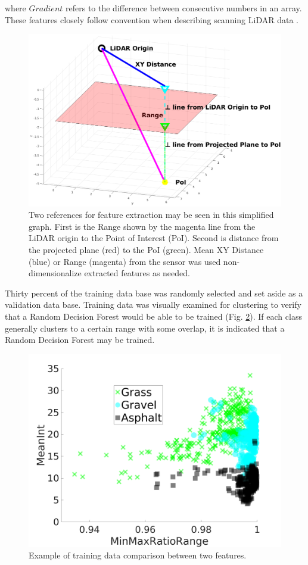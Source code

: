\documentclass[numbered,pdftex]{ohio-etd}
\begin{document}
{{		{where $Gradient$ refers to the difference between consecutive numbers in an array. These features closely follow convention when describing scanning LiDAR data \cite{breiman_random_2001}.}
		
		
		\begin{figure}[H]
			\centering
			\includegraphics[width=1\linewidth]{Defense_Images/xy_vs_range}
			\caption[XY vs Range vs Z Height]{Two references for feature extraction may be seen in this simplified graph. First is the Range shown by the magenta line from the LiDAR origin to the Point of Interest (PoI). Second is distance from the projected plane (red) to the PoI (green). Mean XY Distance (blue) or Range (magenta) from the sensor was used non-dimensionalize extracted features as needed.}
			\label{fig:xy_vs_range}
		\end{figure}
	
		{Thirty percent of the training data base was randomly selected and set aside as a validation data base. Training data was visually examined for clustering to verify that a Random Decision Forest would be able to be trained (Fig. \ref{fig:range_training_data_cluster_3}). If each class generally clusters to a certain range with some overlap, it is indicated that a Random Decision Forest may be trained.}
		
		\begin{figure}[H]
			\centering
			\includegraphics[width=0.75\linewidth]{Defense_Images/training_data_cluster_3}
			\caption[Example Clustering]{Example of training data comparison between two features.}
			\label{fig:range_training_data_cluster_3}
		\end{figure}
		
}}
\end{document}
